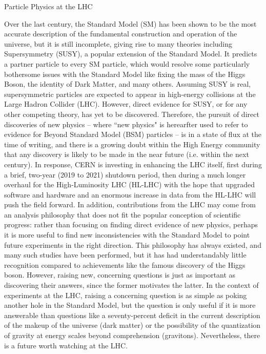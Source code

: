 %
%

\begin{section}{Particle Physics at the LHC}

Over the last century, the Standard Model (SM) has been shown to be the most accurate description of the fundamental construction and operation of the universe, but it is still incomplete, giving rise to many theories including Supersymmetry (SUSY), a popular extension of the Standard Model. It predicts a partner particle to every SM particle, which would resolve some particularly bothersome issues with the Standard Model like fixing the mass of the Higgs Boson, the identity of Dark Matter, and many others. Assuming SUSY is real, supersymmetric particles are expected to appear in high-energy collisions at the Large Hadron Collider (LHC). However, direct evidence for SUSY, or for any other competing theory, has yet to be discovered. Therefore, the pursuit of direct discoveries of new physics -- where ``new physics" is herearfter used to refer to evidence for Beyond Standard Model (BSM) particles -- is in a state of flux at the time of writing, and there is a growing doubt within the High Energy community that any discovery is likely to be made in the near future (i.e. within the next century). In response, CERN is investing in enhancing the LHC itself, first during a brief, two-year (2019 to 2021) shutdown period, then during a much longer overhaul for the High-Luminosity LHC (HL-LHC) with the hope that upgraded software and hardware and an enormous increase in data from the HL-LHC will push the field forward. In addition, contributions from the LHC may come from an analysis philosophy that does not fit the popular conception of scientific progress: rather than focusing on finding direct evidence of new physics, perhaps it is more useful to find new inconsistencies with the Standard Model to point future experiments in the right direction. This philosophy has always existed, and many such studies have been performed, but it has had understandably little recognition compared to achievements like the famous discovery of the Higgs boson. However, raising new, concerning questions is just as important as discovering their answers, since the former motivates the latter. In the context of experiments at the LHC, raising a concerning question is as simple as poking another hole in the Standard Model, but the question is only useful if it is more answerable than questions like a seventy-percent deficit in the current description of the makeup of the universe (dark matter) or the possibility of the quantization of gravity at energy scales beyond comprehension (gravitons). Nevertheless, there is a future worth watching at the LHC.

\end{section}

